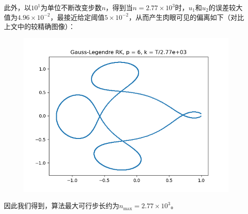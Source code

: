 \documentclass{ctexart}
\begin{document}
\begin{sloppypar}
此外，以$10^1$为单位不断改变步数$n$，得到当$n = 2.77 \times 10^3$时，$u_1$和$u_2$的误差较大值为$4.96 \times 10^{-2}$，最接近给定阈值$5 \times 10^{-2}$，从而产生肉眼可见的偏离如下（对比上文中的较精确图像）：
\begin{figure}[H]
\centering
\includegraphics[scale = 0.45]{./report_src/Figure_34.png}
\end{figure}
因此我们得到，算法最大可行步长约为$n_{\max} = 2.77 \times 10^3$。


\end{sloppypar}
\end{document}
